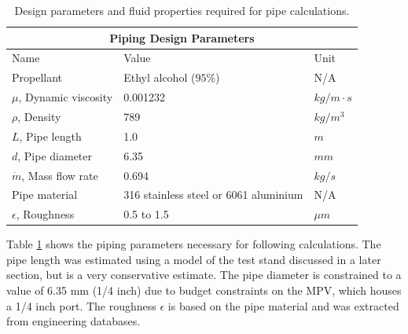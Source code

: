 \documentclass[9pt]{article} %
\numberwithin{equation}{section} %
\begin{document}
\begin{table}[!htb]
\centering
\begin{tabular}{ |p{4cm}||p{6cm}|p{2cm}|  }
\hline
\multicolumn{3}{|c|}{Piping Design Parameters} \\
\hline
Name & Value & Unit \\
\hline
Propellant  &  Ethyl alcohol ($95\%$)   &  N/A \\
$\mu$, Dynamic viscosity  &  0.001232  &  $kg/m \cdot s$ \\
$\rho$, Density  &  789  &  $kg/m^{3}$ \\
$L$, Pipe length  &  1.0  &  $m$   \\
$d$, Pipe diameter  &  6.35  &  $mm$ \\
$\dot{m}$, Mass flow rate  &  0.694  &  $kg/s$ \\
Pipe material  &  316 stainless steel or 6061 aluminium  &  N/A  \\
$\epsilon$, Roughness  &  0.5 to 1.5  &  $\mu m$  \\
\hline
\end{tabular}
\caption{Design parameters and fluid properties required for pipe calculations.}
\label{table:piping_parameters}
\end{table}

Table \ref{table:piping_parameters} shows the piping parameters necessary for following calculations. The pipe length was estimated using a model of the test stand discussed in a later section, but is a very conservative estimate. The pipe diameter is constrained to a value of 6.35 mm (1/4 inch) due to budget constraints on the MPV, which houses a 1/4 inch port. The roughness $\epsilon$ is based on the pipe material and was extracted from engineering databases.
\end{document}
